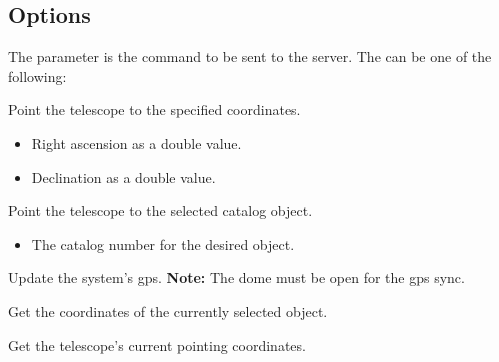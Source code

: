 \documentclass[a4paper,english]{article}
\begin{document}
\subsection{Options}

The  parameter is the command to be sent to the server. The  can be one of the following:

\begin{Description}\setlength{\itemsep}{0cm}
\item[\Arg{goto}] Point the telescope to the specified coordinates.

	     
	
	\begin{itemize}
		\item {} Right ascension as a double value.
		\item {} Declination as a double value.
	\end{itemize}
	
\item[\Arg{messier}] Point the telescope to the selected catalog object.

\item[\Arg{star}]	    
	
\item[\Arg{deepsky}]	    
	
	    
	
	\begin{itemize}
		\item {} The catalog number for the desired object.
	\end{itemize}
	
\item[\Arg{gps}] Update the system's gps. \textbf{Note:} The dome must be open for the gps sync.

	   
	
\item[\Arg{getobjradec}] Get the coordinates of the currently selected object.

	   
	
\item[\Arg{gettelradec}] Get the telescope's current pointing coordinates.


\end{Description}
\end{document}
